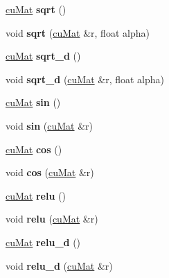 \begin{DoxyCompactItemize}
\mbox{\hyperlink{classcuMat}{cu\+Mat}} {\bfseries sqrt} ()
\item 
\mbox{\label{classcuMat_ac2851f60a7f5510c954db6f3cb332200}} 
void {\bfseries sqrt} (\mbox{\hyperlink{classcuMat}{cu\+Mat}} \&r, float alpha)
\item 
\mbox{\label{classcuMat_a662acda2f93bc8495137fdab3ddf3def}} 
\mbox{\hyperlink{classcuMat}{cu\+Mat}} {\bfseries sqrt\+\_\+d} ()
\item 
\mbox{\label{classcuMat_ae8e40250b9bb27bc61734147562f8931}} 
void {\bfseries sqrt\+\_\+d} (\mbox{\hyperlink{classcuMat}{cu\+Mat}} \&r, float alpha)
\item 
\mbox{\label{classcuMat_aaf4c738be46108eda5e8dd0e366ad558}} 
\mbox{\hyperlink{classcuMat}{cu\+Mat}} {\bfseries sin} ()
\item 
\mbox{\label{classcuMat_acf4bc9e0bd618e1eee6adb6a71cb5eb0}} 
void {\bfseries sin} (\mbox{\hyperlink{classcuMat}{cu\+Mat}} \&r)
\item 
\mbox{\label{classcuMat_acd8a9cb21adefd0474e5abfc4f23a5be}} 
\mbox{\hyperlink{classcuMat}{cu\+Mat}} {\bfseries cos} ()
\item 
\mbox{\label{classcuMat_ab063a7e67eda9e94eccc790a352f97fd}} 
void {\bfseries cos} (\mbox{\hyperlink{classcuMat}{cu\+Mat}} \&r)
\item 
\mbox{\label{classcuMat_a68c274726e41f2f6ae73846ce4ddc5d2}} 
\mbox{\hyperlink{classcuMat}{cu\+Mat}} {\bfseries relu} ()
\item 
\mbox{\label{classcuMat_af26245ee55e5b69f57b670bc1f7f00ef}} 
void {\bfseries relu} (\mbox{\hyperlink{classcuMat}{cu\+Mat}} \&r)
\item 
\mbox{\label{classcuMat_aa91feaab962dbc3b4bd7623bb06b8aef}} 
\mbox{\hyperlink{classcuMat}{cu\+Mat}} {\bfseries relu\+\_\+d} ()
\item 
\mbox{\label{classcuMat_aab11509fe9ac255fced45363e264e4bf}} 
void {\bfseries relu\+\_\+d} (\mbox{\hyperlink{classcuMat}{cu\+Mat}} \&r)

\end{DoxyCompactItemize}
